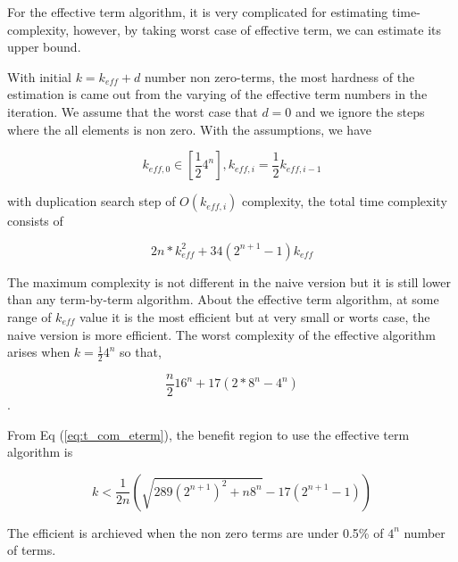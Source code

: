 \documentclass[twocolumn]{article}
\begin{document}
For the effective term algorithm,
it is very complicated for estimating time-complexity,
however, by taking worst case of effective term, we can estimate its upper bound.

With initial $k = k_{eff} +d$ number non zero-terms,
the most hardness of the estimation is came out from the varying 
of the effective term numbers in the iteration.
We assume that the worst case that $d=0$ and we ignore the 
steps where the all elements is non zero.
With the assumptions, we have 

\begin{equation}
    k_{eff, 0} \in [\frac{1}{2}4^{n}], k_{eff, i} = \frac{1}{2} k_{eff, i-1}
\end{equation}

with duplication search step of $O(k_{eff, i})$ complexity,
the total time complexity consists of 

\begin{equation}
    \label{eq:t_com_eterm}
    2 n * k_{eff}^2 + 34 (2^{n+1} -1) k_{eff}
\end{equation} 

The maximum complexity is not different in the naive version but it is still
lower than any term-by-term algorithm. About the effective term algorithm,
at some range of $k_{eff}$ value it is the most efficient but 
at very small or worts case, the naive version is more efficient. 
The worst complexity of the effective algorithm arises 
when $k=\frac{1}{2}4^n$ so that,

\begin{equation}
    \frac{n}{2} 16^n + 17 (2 * 8^n - 4^n) 
\end{equation}.

From Eq (\ref{eq:t_com_eterm}), the benefit region to use 
the effective term algorithm is 

\begin{equation}
    k < \frac{1}{2n} \left(\sqrt{289(2^{n+1})^2 + n 8^n} - 17 (2^{n+1} -1) \right) 
\end{equation}

The efficient is archieved when the non zero terms are under 0.5\% of $4^n$ number of terms.
\end{document}
